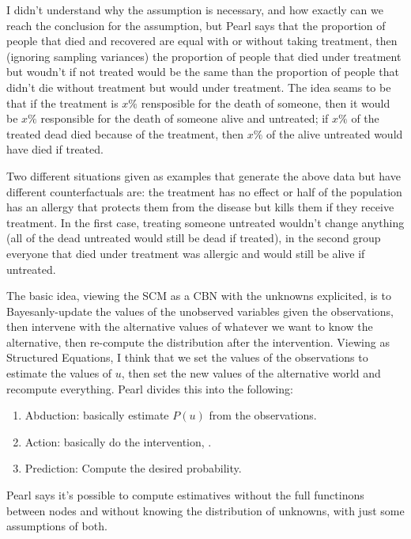 I didn't understand why the assumption is necessary, and how exactly can we reach the conclusion for the assumption, but Pearl says that the proportion of people that died and recovered are equal with or without taking treatment, then (ignoring sampling variances) the proportion of people that died under treatment but woudn't if not treated would be the same than the proportion of people that didn't die without treatment but would under treatment. The idea seams to be that if the treatment is $x\%$ rensposible for the death of someone, then it would be $x\%$ responsible for the death of someone alive and untreated; if $x\%$ of the treated dead died because of the treatment, then $x\%$ of the alive untreated would have died if treated.

Two different situations given as examples that generate the above data but have different counterfactuals are: the treatment has no effect or half of the population has an allergy that protects them from the disease but kills them if they receive treatment. In the first case, treating someone untreated wouldn't change anything (all of the dead untreated would still be dead if treated), in the second group everyone that died under treatment was allergic and would still be alive if untreated.

The basic idea, viewing the SCM as a CBN with the unknowns explicited, is to Bayesanly-update the values of the unobserved variables given the observations, then intervene with the alternative values of whatever we want to know the alternative, then re-compute the distribution after the intervention. Viewing as Structured Equations, I think that we set the values of the observations to estimate the values of $u$, then set the new values of the alternative world and recompute everything. Pearl divides this into the following:

\begin{enumerate}
\item Abduction: basically estimate $P(u)$ from the observations.
\item Action: basically do the intervention, .
\item Prediction: Compute the desired probability.
\end{enumerate}

Pearl says it's possible to compute estimatives without the full functinons between nodes and without knowing the distribution of unknowns, with just some assumptions of both.


